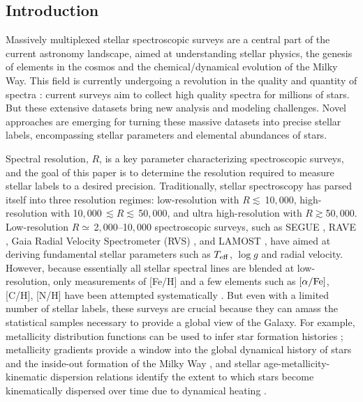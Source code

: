 \documentclass[iop]{emulateapj}
\begin{document}
\begin{CJK*}{UTF8}{gbsn}


%
%
%
%
%
%

 \section{Introduction}
\label{sec:introduction}

Massively multiplexed stellar spectroscopic surveys are a central part of the current astronomy landscape, aimed at understanding stellar physics, the genesis of elements in the cosmos and the chemical/dynamical evolution of the Milky Way. This field is currently undergoing a revolution in the quality and quantity of spectra \citep[e.g., see review from][]{rix13}: current surveys aim to collect high quality spectra for millions of stars. But these extensive datasets bring new analysis and modeling challenges. Novel approaches are emerging \citep[e.g.,][]{nes15a,cas16,rix16,tin16} for turning these massive datasets into precise stellar labels, encompassing stellar parameters and elemental abundances of stars.

Spectral resolution, $R$, is a key parameter characterizing spectroscopic surveys, and the goal of this paper is to determine the resolution required to measure stellar labels to a desired precision. Traditionally, stellar spectroscopy has parsed itself into three resolution regimes: low-resolution with $R \lesssim \ $10$,$000, high-resolution with 10$,$000$ \, \lesssim R \lesssim \, $50$,$000, and ultra high-resolution with $R \gtrsim $50$,$000. Low-resolution $R \simeq \,$2$,$000--10$,$000 spectroscopic surveys, such as SEGUE \citep{yan09}, RAVE \citep{ste06}, Gaia Radial Velocity Spectrometer (RVS) \citep{rec16}, and LAMOST \citep{luo15}, have aimed at deriving fundamental stellar parameters such as $T_{\rm eff}$, $\log g$ and radial velocity. However, because essentially all stellar spectral lines are blended at low-resolution, only measurements of [Fe/H] and a few elements such as $[\alpha/{\rm Fe}]$, [C/H], [N/H] have been attempted systematically \citep[e.g.,][]{kir10,lee11,lee13,yan13,fra16}. But even with a limited number of stellar labels, these surveys are crucial because they can amass the statistical samples necessary to provide a global view of the Galaxy. For example, metallicity distribution functions can be used to infer star formation histories \citep[e.g.,][]{cas11,hay15}; metallicity gradients provide a window into the global dynamical history of stars \citep[e.g.,][]{sch09,gra15,kaw16} and the inside-out formation of the Milky Way \citep[e.g.,][]{min14,sch16}, and stellar age-metallicity-kinematic dispersion relations identify the extent to which stars become kinematically dispersed over time due to dynamical heating \citep[e.g.,][]{mar14,aum16,gra16}. 


\end{CJK*}
\end{document}
